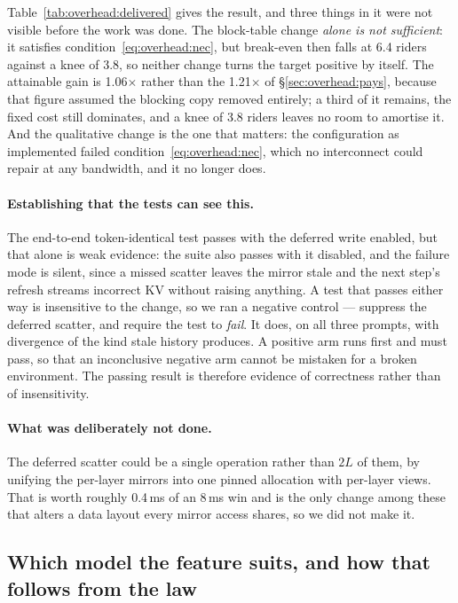 Table~\ref{tab:overhead:delivered} gives the result, and three things in it were
not visible before the work was done. The block-table change \emph{alone is not
sufficient}: it satisfies condition~\ref{eq:overhead:nec}, but break-even then
falls at 6.4 riders against a knee of 3.8, so neither change turns the target
positive by itself. The attainable gain is 1.06$\times$ rather than the
1.21$\times$ of \S\ref{sec:overhead:pays}, because that figure assumed the
blocking copy removed entirely; a third of it remains, the fixed cost still
dominates, and a knee of 3.8 riders leaves no room to amortise it. And the
qualitative change is the one that matters: the configuration as implemented
failed condition~\ref{eq:overhead:nec}, which no interconnect could repair at
any bandwidth, and it no longer does.

\paragraph{Establishing that the tests can see this.} The end-to-end
token-identical test passes with the deferred write enabled, but that alone is
weak evidence: the suite also passes with it disabled, and the failure mode is
silent, since a missed scatter leaves the mirror stale and the next step's
refresh streams incorrect KV without raising anything. A test that passes either
way is insensitive to the change, so we ran a negative control --- suppress the
deferred scatter, and require the test to \emph{fail}. It does, on all three
prompts, with divergence of the kind stale history produces. A positive arm runs
first and must pass, so that an inconclusive negative arm cannot be mistaken for
a broken environment. The passing result is therefore evidence of correctness
rather than of insensitivity.

\paragraph{What was deliberately not done.} The deferred scatter could be a
single operation rather than $2L$ of them, by unifying the per-layer mirrors
into one pinned allocation with per-layer views. That is worth roughly 0.4\,ms
of an 8\,ms win and is the only change among these that alters a data layout
every mirror access shares, so we did not make it.

\subsection{Which model the feature suits, and how that follows from the law}
\label{sec:overhead:bestmodel}

